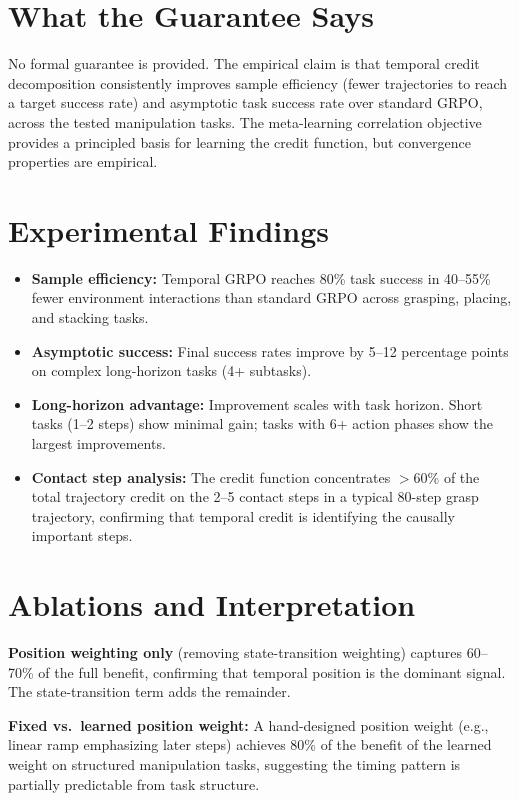 \documentclass[10pt,twocolumn]{article}
\begin{document}
\section{What the Guarantee Says}

No formal guarantee is provided. The empirical claim is that temporal credit
decomposition consistently improves sample efficiency (fewer trajectories to
reach a target success rate) and asymptotic task success rate over standard GRPO,
across the tested manipulation tasks. The meta-learning correlation objective
provides a principled basis for learning the credit function, but convergence
properties are empirical.

\section{Experimental Findings}

\begin{itemize}[itemsep=2pt,parsep=0pt]
  \item \textbf{Sample efficiency:} Temporal GRPO reaches 80\% task success
    in 40--55\% fewer environment interactions than standard GRPO across
    grasping, placing, and stacking tasks.
  \item \textbf{Asymptotic success:} Final success rates improve by 5--12
    percentage points on complex long-horizon tasks (4+ subtasks).
  \item \textbf{Long-horizon advantage:} Improvement scales with task horizon.
    Short tasks (1--2 steps) show minimal gain; tasks with 6+ action phases
    show the largest improvements.
  \item \textbf{Contact step analysis:} The credit function concentrates
    $>$60\% of the total trajectory credit on the 2--5 contact steps in a
    typical 80-step grasp trajectory, confirming that temporal credit is
    identifying the causally important steps.
\end{itemize}

\section{Ablations and Interpretation}

\textbf{Position weighting only} (removing state-transition weighting) captures
60--70\% of the full benefit, confirming that temporal position is the dominant
signal. The state-transition term adds the remainder.

\textbf{Fixed vs.\ learned position weight:} A hand-designed position weight
(e.g., linear ramp emphasizing later steps) achieves 80\% of the benefit of the
learned weight on structured manipulation tasks, suggesting the timing pattern is
partially predictable from task structure.
\end{document}

